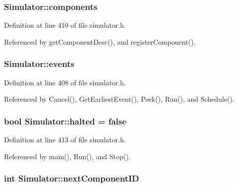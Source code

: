 \subsubsection[{components}]{ {\bf Simulator::components}\hspace{0.3cm}{\tt  [static, private]}}\label{classSimulator_43a4085bf6efd14a954a2a078d2d8f19}




Definition at line 410 of file simulator.h.

Referenced by getComponentDesc(), and registerComponent().
\subsubsection[{events}]{ {\bf Simulator::events}\hspace{0.3cm}{\tt  [static, private]}}\label{classSimulator_4dc17b94fbab63fe9a7f44c9addf0df3}




Definition at line 408 of file simulator.h.

Referenced by Cancel(), GetEarliestEvent(), Peek(), Run(), and Schedule().
\subsubsection[{halted}]{\setlength{\rightskip}{0pt plus 5cm}bool {\bf Simulator::halted} = false\hspace{0.3cm}{\tt  [static, private]}}\label{classSimulator_2fbf0fb13aebc2ba3e2b4a1140a5f92a}




Definition at line 413 of file simulator.h.

Referenced by main(), Run(), and Stop().
\subsubsection[{nextComponentID}]{\setlength{\rightskip}{0pt plus 5cm}int {\bf Simulator::nextComponentID}\hspace{0.3cm}{\tt  [static, private]}}\label{classSimulator_c6b0293986cf31600e16177d0f29d3f9}




